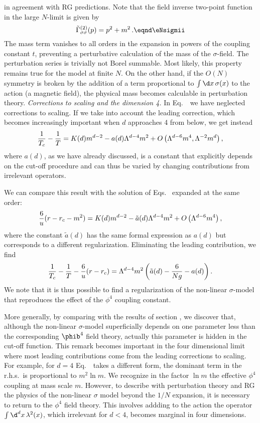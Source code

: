 in agreement with RG predictions. Note that the field inverse two-point
function in the large $N$-limit is given by
$$\tilde\Gamma^{(2)}_{\sigma\sigma}(p)=p^2 + m^2\,. \eqnd\eNsigmii $$
The mass term vanishes to all orders in the expansion in powers of
the coupling constant $t$, preventing a perturbative calculation of
the mass of the $\sigma$-field. The perturbation series is
trivially not Borel summable. Most likely, this property remains true for the
model at finite $N$. On the other hand, if the $O(N)$ symmetry is broken by
the addition of a term proportional to $ \int\d x\,\sigma(x)$ to the action (a magnetic field), the
physical mass becomes calculable in perturbation theory.
\medskip
{\it Corrections to scaling and the dimension 4.} In Eq.~\emasNsig\
we have neglected corrections to scaling. If we take into account the leading
correction, which becomes increasingly important when $d$ approaches 4 from below,  we get instead
$$ {1\over T_c}-{1\over  T}=K(d)m^{d-2} -a(d)\Lambda ^{d-4}m^2   +O\left(\Lambda ^{d-6}m^4, \Lambda ^{-2}m^d\right),$$
where $a(d)$, as we have already discussed, is a constant that explicitly
depends on the cut-off procedure and can thus be varied by changing
contributions from irrelevant operators.\par
We can compare this result with the solution of Eqs.~\ecorleng{} expanded
at the same order:
$${6\over u}(r-r_c-m^2)=K(d)m^{d-2} -\tilde a(d)\Lambda ^{d-4}m^2   +O\left(\Lambda ^{d-6}m^4\right),$$
where the constant $\tilde a(d)$ has the same formal expression as $a(d)$ but corresponds to a different regularization. Eliminating the leading contribution, we find
$$ {1\over  T_c}-{1\over  T}-{6\over u}(r-r_c)=\Lambda ^{d-4}m^2
\left(\tilde a(d)-{6\over Ng}-a(d)\right).$$
We note that it is thus possible to find a regularization of the non-linear $\sigma $-model that reproduces the effect of the $\phi^4$ coupling constant.
\par
More generally, by comparing with the results of section \sssEGRN, we discover that,
although the non-linear $\sigma$-model superficially depends on one parameter
less than the corresponding $\phib^4$ field theory, actually this parameter is
hidden in the cut-off function. This remark becomes important in the four
dimensional limit where most leading contributions come from the leading
corrections to scaling. For example, for $d=4$ Eq.~\emasNsig\ takes a
different form, the dominant term in the r.h.s.\ is proportional to
$m^2\ln m$. We recognize in the factor $\ln m$ the effective
$\phi^4$ coupling at mass scale $m$. However,
to describe with perturbation theory and RG the physics
of the non-linear $\sigma$ model beyond the $1/N$ expansion,  it is necessary  to return to the $\phi^4$ field theory. This involves addding to the action
the operator $\int\d^d x\,\lambda^2(x)$, which irrelevant for $d<4$,
becomes marginal in four dimensions.
%

